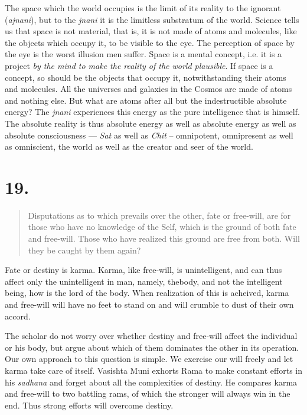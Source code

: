 \documentclass[12pt]{report}
\begin{document}

The space which the world occupies is the limit of its reality to the
ignorant (\emph{ajnani}), but to the \emph{jnani} it is the limitless
substratum of the world. Science tells us that space is not material,
that is, it is not made of atoms and molecules, like the objects which
occupy it, to be visible to the eye. The perception of space by the
eye is the worst illusion men suffer. Space is a mental concept,
i.e. it is a project \emph{by the mind to make the reality of the
  world plausible}. If space is a concept, so should be the objects
that occupy it, notwithstanding their atoms and molecules. All the
universes and galaxies in the Cosmos are made of atoms and nothing
else. But what are atoms after all but the indestructible absolute
energy? The \emph{jnani} experiences this energy as the pure
intelligence that is himself. The absolute reality is thus absolute
energy as well as absolute energy as well as absolute consciousness
--- \emph{Sat} as well as \emph{Chit} -- omnipotent, omnipresent as
well as omniscient, the world as well as the creator and seer of the
world. 

\section{19. }

\begin{quote}
  Disputations as to which prevails over the other, fate or free-will,
  are for those who have no knowledge of the Self, which is the ground
  of both fate and free-will. Those who have realized this ground are
  free from both. Will they be caught by them again?
\end{quote}


Fate or destiny is karma. Karma, like free-will, is unintelligent, and
can thus affect only the unintelligent in man, namely, thebody, and
not the intelligent being, how is the lord of the body. When
realization of this is acheived, karma and free-will will have no feet
to stand on and will crumble to dust of their own accord.

The scholar do not worry over whether destiny and free-will affect the
individual or his body, but argue about which of them dominates the
other in its operation. Our own approach to this question is
simple. We exercise our will freely and let karma take care of
itself. Vasishta Muni exhorts Rama to make constant efforts in his
\emph{sadhana} and forget about all the complexities of destiny. He
compares karma and free-will to two battling rams, of which the
stronger will always win in the end. Thus strong efforts will overcome
destiny.
\end{document}
